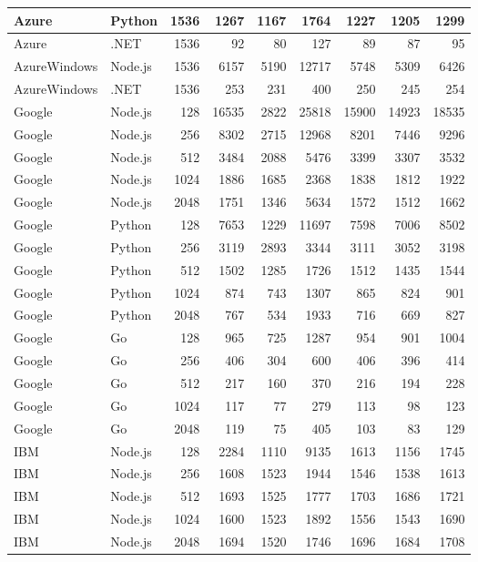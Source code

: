 \begin{table}[htp]
{\begin{tabular}{|l|l|r|r|r|r|r|r|r|}
Azure	&	Python	&	1536	&	1267	&	1167	&	1764	&	1227	&	1205	&	1299	\\ \hline
Azure	&	.NET	&	1536	&	92	&	80	&	127	&	89	&	87	&	95	\\ \hline
AzureWindows	&	Node.js	&	1536	&	6157	&	5190	&	12717	&	5748	&	5309	&	6426	\\ \hline
AzureWindows	&	.NET	&	1536	&	253	&	231	&	400	&	250	&	245	&	254	\\ \hline
Google	&	Node.js	&	128	&	16535	&	2822	&	25818	&	15900	&	14923	&	18535	\\ \hline
Google	&	Node.js	&	256	&	8302	&	2715	&	12968	&	8201	&	7446	&	9296	\\ \hline
Google	&	Node.js	&	512	&	3484	&	2088	&	5476	&	3399	&	3307	&	3532	\\ \hline
Google	&	Node.js	&	1024	&	1886	&	1685	&	2368	&	1838	&	1812	&	1922	\\ \hline
Google	&	Node.js	&	2048	&	1751	&	1346	&	5634	&	1572	&	1512	&	1662	\\ \hline
Google	&	Python	&	128	&	7653	&	1229	&	11697	&	7598	&	7006	&	8502	\\ \hline
Google	&	Python	&	256	&	3119	&	2893	&	3344	&	3111	&	3052	&	3198	\\ \hline
Google	&	Python	&	512	&	1502	&	1285	&	1726	&	1512	&	1435	&	1544	\\ \hline
Google	&	Python	&	1024	&	874	&	743	&	1307	&	865	&	824	&	901	\\ \hline
Google	&	Python	&	2048	&	767	&	534	&	1933	&	716	&	669	&	827	\\ \hline
Google	&	Go	&	128	&	965	&	725	&	1287	&	954	&	901	&	1004	\\ \hline
Google	&	Go	&	256	&	406	&	304	&	600	&	406	&	396	&	414	\\ \hline
Google	&	Go	&	512	&	217	&	160	&	370	&	216	&	194	&	228	\\ \hline
Google	&	Go	&	1024	&	117	&	77	&	279	&	113	&	98	&	123	\\ \hline
Google	&	Go	&	2048	&	119	&	75	&	405	&	103	&	83	&	129	\\ \hline
IBM	&	Node.js	&	128	&	2284	&	1110	&	9135	&	1613	&	1156	&	1745	\\ \hline
IBM	&	Node.js	&	256	&	1608	&	1523	&	1944	&	1546	&	1538	&	1613	\\ \hline
IBM	&	Node.js	&	512	&	1693	&	1525	&	1777	&	1703	&	1686	&	1721	\\ \hline
IBM	&	Node.js	&	1024	&	1600	&	1523	&	1892	&	1556	&	1543	&	1690	\\ \hline
IBM	&	Node.js	&	2048	&	1694	&	1520	&	1746	&	1696	&	1684	&	1708	\\ \hline

\end{tabular}}
\end{table}
